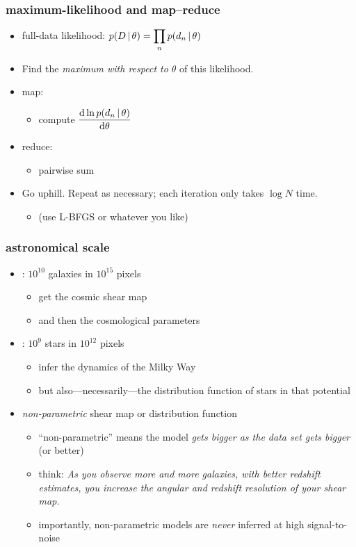 \documentclass[pdftex]{beamer}
\begin{document}
\begin{frame}
  \frametitle{maximum-likelihood and map--reduce}
  \begin{itemize}
  \item full-data likelihood: $\displaystyle p(D\,|\,\theta) =
    \prod_n p(d_n\,|\,\theta)$
  \item Find the \emph{maximum with respect to $\theta$} of this
    likelihood.
  \item map:
    \begin{itemize}
    \item compute $\displaystyle\frac{\mathrm{d} \ln p(d_n\,|\,\theta)}{\mathrm{d}\theta}$
    \end{itemize}
  \item reduce:
    \begin{itemize}
    \item pairwise sum
    \end{itemize}
  \item Go uphill.  Repeat as necessary; each iteration only takes
    $\log N$ time.
    \begin{itemize}
    \item (use L-BFGS or whatever you like)
    \end{itemize}
  \end{itemize}
\end{frame}

\begin{frame}
  \frametitle{astronomical scale}
  \begin{itemize}
  \item \lsst: $10^{10}$ galaxies in $10^{15}$ pixels
    \begin{itemize}
    \item get the cosmic shear map
    \item and then the cosmological parameters
    \end{itemize}
  \item \gaia: $10^{9}$ stars in $10^{12}$ pixels
    \begin{itemize}
    \item infer the dynamics of the Milky Way
    \item but also---necessarily---the distribution function of stars
      in that potential
    \end{itemize}
  \item \emph{non-parametric} shear map or distribution function
    \begin{itemize}
    \item ``non-parametric'' means the model \emph{gets bigger as the
      data set gets bigger} (or better)
    \item think: \emph{As you observe more and more galaxies, with
      better redshift estimates, you increase the angular and redshift
      resolution of your shear map.}
    \item importantly, non-parametric models are \emph{never} inferred
      at high signal-to-noise
    \end{itemize}
  \end{itemize}
\end{frame}
\end{document}

